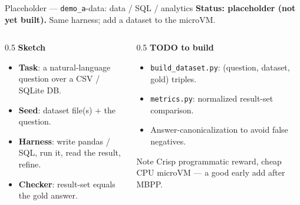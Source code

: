 \documentclass[aspectratio=169]{beamer}
\begin{document}
\begin{frame}{Placeholder --- \texttt{demo\_a}-data: data / SQL / analytics}
  \footnotesize\textbf{Status: placeholder (not yet built).} Same harness; add a dataset to the microVM.
  \begin{columns}[T]
    \begin{column}{0.5\textwidth}
      \textbf{Sketch}
      \begin{itemize}\scriptsize\setlength\itemsep{0.1em}
        \item \textbf{Task}: a natural-language question over a CSV / SQLite DB.
        \item \textbf{Seed}: dataset file(s) $+$ the question.
        \item \textbf{Harness}: write pandas / SQL, run it, read the result, refine.
        \item \textbf{Checker}: result-set equals the gold answer.
      \end{itemize}
    \end{column}
    \begin{column}{0.5\textwidth}
      \textbf{TODO to build}
      \begin{itemize}\scriptsize\setlength\itemsep{0.1em}
        \item \texttt{build\_dataset.py}: (question, dataset, gold) triples.
        \item \texttt{metrics.py}: normalized result-set comparison.
        \item Answer-canonicalization to avoid false negatives.
      \end{itemize}
      \begin{block}{Note}
        \scriptsize Crisp programmatic reward, cheap CPU microVM --- a good early add after MBPP.
      \end{block}
    \end{column}
  \end{columns}
\end{frame}
\end{document}
